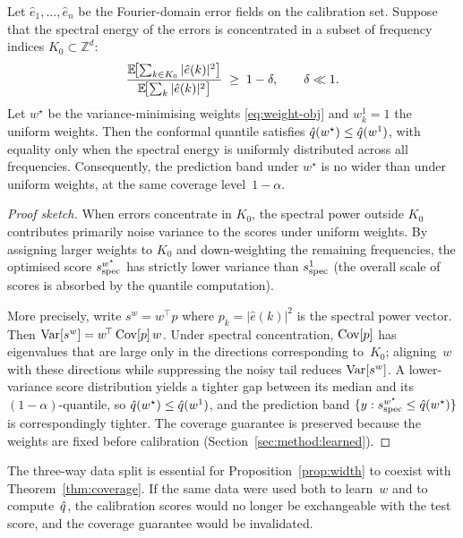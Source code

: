\begin{proposition}
\label{prop:width}
Let $\hat{e}_1, \dots, \hat{e}_n$ be the Fourier-domain error fields on
the calibration set.  Suppose that the spectral energy of the errors is
concentrated in a subset of frequency indices $K_0 \subset \mathbb{Z}^d$:
\begin{equation}
  \frac{\operatorname{\mathbb{E}}\!\bigl[\sum_{k \in K_0} |\hat{e}(k)|^2\bigr]}
       {\operatorname{\mathbb{E}}\!\bigl[\sum_{k} |\hat{e}(k)|^2\bigr]}
  \;\geq\; 1 - \delta,
  \qquad \delta \ll 1.
\end{equation}
Let $w^{\star}$ be the variance-minimising weights
\eqref{eq:weight-obj} and $w^{1}_k = 1$ the uniform weights.
Then the conformal quantile satisfies
$\hat{q}(w^{\star}) \leq \hat{q}(w^{1})$, with equality only when the
spectral energy is uniformly distributed across all frequencies.
Consequently, the prediction band under $w^{\star}$ is no wider than
under uniform weights, at the same coverage level~$1-\alpha$.
\end{proposition}

\begin{proof}[Proof sketch]
When errors concentrate in $K_0$, the spectral power outside $K_0$
contributes primarily noise variance to the scores under uniform weights.
By assigning larger weights to $K_0$ and down-weighting the remaining
frequencies, the optimised score $s_{\mathrm{spec}}^{w^{\star}}$ has strictly lower
variance than $s_{\mathrm{spec}}^{1}$ (the overall scale of scores is absorbed by the
quantile computation).

More precisely, write $s^{w} = w^{\!\top} p$ where
$p_k = |\hat{e}(k)|^2$ is the spectral power vector.  Then
$\operatorname{Var}[s^{w}] = w^{\!\top} \operatorname{Cov}[p]\, w$.  Under spectral concentration,
$\operatorname{Cov}[p]$ has eigenvalues that are large only in the directions
corresponding to~$K_0$; aligning~$w$ with these directions while
suppressing the noisy tail reduces $\operatorname{Var}[s^{w}]$.  A lower-variance
score distribution yields a tighter gap between its median and its
$(1-\alpha)$-quantile, so $\hat{q}(w^{\star}) \leq \hat{q}(w^{1})$, and the
prediction band $\{y : s_{\mathrm{spec}}^{w^{\star}} \leq \hat{q}(w^{\star})\}$ is
correspondingly tighter.  The coverage guarantee is preserved because
the weights are fixed before calibration
(Section~\ref{sec:method:learned}).
\end{proof}

\begin{remark}
The three-way data split is essential for
Proposition~\ref{prop:width} to coexist with Theorem~\ref{thm:coverage}.
If the same data were used both to learn~$w$ and to compute~$\hat{q}$,
the calibration scores would no longer be exchangeable with the test
score, and the coverage guarantee would be invalidated.
\end{remark}
